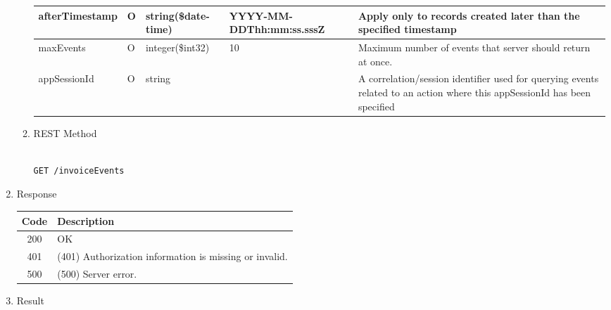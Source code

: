 \begin{enumerate}
\begin{enumerate}
\begin{table}[H]
\begin{center}
\begin{tabular}{|p{3cm}|l|p{3cm}|p{3cm}|p{4cm}|}
afterTimestamp			& O &	string(\$date-time)	&	YYYY-MM-DDThh:mm:ss.sssZ	&	Apply only to records created later than the specified timestamp \\
\hline

maxEvents				& O & 	integer(\$int32)	&	10							&	Maximum number of events that server should return at once. \\
\hline

appSessionId			& O &	string				&								&	A correlation/session identifier used for querying events related to 
																						an action where this appSessionId has been specified \\
\hline

\end{tabular}
\end{center}
\end{table}


\item REST Method

\begin{tcolorbox}[boxrule=0pt, frame empty]
\begin{verbatim} 

GET /invoiceEvents

\end{verbatim}
\end{tcolorbox}

\end{enumerate}

\item Response

\begin{table}[H]
\footnotesize

\begin{center}
\begin{tabular}{|c|l|} 
\hline
\rowcolor{lightgray}	Code 		& 	Description \\
\hline
200	 		&	OK \\
\hline
401			&	(401) Authorization information is missing or invalid. \\
\hline
500			&	(500) Server error. \\
\hline
\end{tabular}
\end{center}

\end{table}

\item Result


\end{enumerate}
